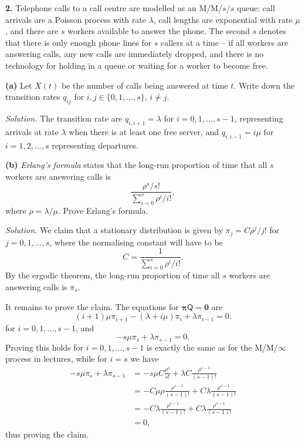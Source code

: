\documentclass[
  a4paper,
]{article}
\theoremstyle{definition}
\theoremstyle{definition}
\theoremstyle{definition}
\theoremstyle{remark}
\begin{document}
\textbf{2.} Telephone calls to a call centre are modelled as an M/M/\(s\)/\(s\) queue: call arrivals are a Poisson process with rate \(\lambda\), call lengths are exponential with rate \(\mu\), and there are \(s\) workers available to answer the phone. The second \(s\) denotes that there is only enough phone lines for \(s\) callers at a time -- if all workers are answering calls, any new calls are immediately dropped, and there is no technology for holding in a queue or waiting for a worker to become free.

\textbf{(a)} Let \(X(t)\) be the number of calls being answered at time \(t\). Write down the transition rates \(q_{ij}\) for \(i,j \in \{0,1,\dots,s\}\), \(i\neq j\).

\begin{myanswers}
\emph{Solution.}
The transition rate are \(q_{i,i+1} = \lambda\) for \(i = 0,1,\dots, s-1\), representing arrivals at rate \(\lambda\) when there is at least one free server, and \(q_{i,i-1} = i\mu\) for \(i = 1,2,\dots, s\) representing departures.

\end{myanswers}

\textbf{(b)} \emph{Erlang's formula} states that the long-run proportion of time that all \(s\) workers are answering calls is
\[ \frac{\rho^s/s!}{\sum_{i=0}^s \rho^i/i!} ,       \]
where \(\rho = \lambda/\mu\). Prove Erlang's formula.

\begin{myanswers}
\emph{Solution.}
We claim that a stationary distribution is given by \(\pi_j = C \rho^j/j!\) for \(j = 0,1,\dots, s\), where the normalising constant will have to be
\[ C = \frac{1}{\sum_{i=0}^s \rho^i/i!} . \]
By the ergodic theorem, the long-run proportion of time all \(s\) workers are answering calls is \(\pi_s\).

It remains to prove the claim. The equations for \(\boldsymbol\pi \mathsf Q = \mathbf 0\) are
\[     (i+1)\mu \pi_{i+1} - (\lambda + i\mu)\pi_i + \lambda \pi_{i-1} = 0.
  \]
for \(i = 0,1,\dots, s-1\), and
\[     - s\mu\pi_s + \lambda \pi_{s-1} = 0  . \]
Proving this holds for \(i = 0,1,\dots,s-1\) is exactly the same as for the M/M/\(\infty\) process in lectures, while for \(i =s\) we have
\begin{align*}
- s\mu\pi_s + \lambda \pi_{s-1}
&= -s\mu C \frac{\rho^s}{s!} + \lambda C \frac{\rho^{s-1}}{(s-1)!} \\
&= - C \mu \rho \frac{\rho^{s-1}}{(s-1)!} + C \lambda \frac{\rho^{s-1}}{(s-1)!} \\
&= - C \lambda \frac{\rho^{s-1}}{(s-1)!} + C \lambda \frac{\rho^{s-1}}{(s-1)!} \\
&= 0       , 
\end{align*}
thus proving the claim.

\end{myanswers}
\end{document}
